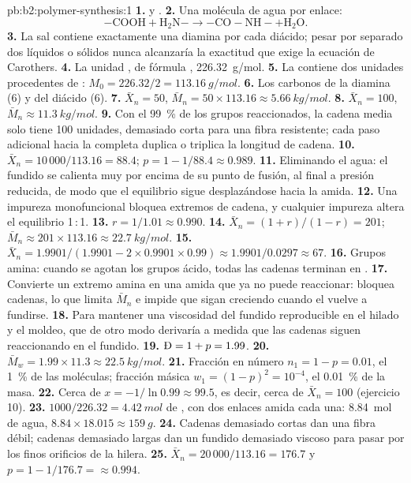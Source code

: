 \begin{solution}{pb:b2:polymer-synthesis:1}
\textbf{1.}  y .
\textbf{2.} Una molécula de agua por enlace:
\[\mathrm{{-}COOH + H_2N{-} \longrightarrow {-}CO{-}NH{-} + H_2O}.\]
\textbf{3.} La sal contiene exactamente una diamina por cada diácido; pesar por separado dos líquidos o sólidos
nunca alcanzaría la exactitud que exige la ecuación de Carothers.
\textbf{4.} La unidad \ce{-[NH(CH2)6NH-CO(CH2)4CO]-}, de fórmula , \qty{226.32}{g/mol}.
\textbf{5.} La  contiene dos unidades procedentes de : $M_0 = 226.32/2 = \qty{113.16}{g/mol}$.
\textbf{6.} Los carbonos de la diamina (6) y del diácido (6).
\textbf{7.} $\bar X_n = 50$, $\bar M_n = 50 \times 113.16 \approx \qty{5.66}{kg/mol}$.
\textbf{8.} $\bar X_n = 100$, $\bar M_n \approx \qty{11.3}{kg/mol}$.
\textbf{9.} Con el 99~\% de los grupos reaccionados, la cadena media solo tiene 100 unidades, demasiado corta para una
fibra resistente; cada paso adicional hacia la  completa duplica o triplica la longitud de cadena.
\textbf{10.} $\bar X_n = 10\,000/113.16 = 88.4$; $p = 1 - 1/88.4 \approx 0.989$.
\textbf{11.} Eliminando el agua: el fundido se calienta muy por encima de su punto de fusión, al final a presión
reducida, de modo que el equilibrio sigue desplazándose hacia la amida.
\textbf{12.} Una impureza monofuncional bloquea extremos de cadena, y cualquier impureza altera el equilibrio 1\,:\,1.
\textbf{13.} $r = 1/1.01 \approx 0.990$.
\textbf{14.} $\bar X_n = (1+r)/(1-r) = 201$; $\bar M_n \approx 201 \times 113.16 \approx
\qty{22.7}{kg/mol}$.
\textbf{15.} $\bar X_n = 1.9901/(1.9901 - 2 \times 0.9901 \times 0.99) \approx 1.9901/0.0297 \approx
67$.
\textbf{16.} Grupos amina: cuando se agotan los grupos ácido, todas las cadenas terminan en .
\textbf{17.} Convierte un extremo amina en una amida que ya no puede reaccionar: bloquea cadenas, lo que limita
$\bar M_n$ e impide que sigan creciendo cuando el  vuelve a fundirse.
\textbf{18.} Para mantener una viscosidad del fundido reproducible en el hilado y el moldeo, que de otro modo
derivaría a medida que las cadenas siguen reaccionando en el fundido.
\textbf{19.} $\text{\DH} = 1 + p = 1.99$.
\textbf{20.} $\bar M_w = 1.99 \times 11.3 \approx \qty{22.5}{kg/mol}$.
\textbf{21.} Fracción en número $n_1 = 1 - p = 0.01$, el 1~\% de las moléculas; fracción másica $w_1 = (1-p)^2 =
10^{-4}$, el 0.01~\% de la masa.
\textbf{22.} Cerca de $x = -1/\ln 0.99 \approx 99.5$, es decir, cerca de $\bar X_n = 100$ (ejercicio 10).
\textbf{23.} $1000/226.32 = \qty{4.42}{mol}$ de , con dos enlaces amida cada una: \qty{8.84}{mol} de
agua, $8.84 \times 18.015 \approx \qty{159}{g}$.
\textbf{24.} Cadenas demasiado cortas dan una fibra débil; cadenas demasiado largas dan un fundido demasiado viscoso para pasar
por los finos orificios de la hilera.
\textbf{25.} $\bar X_n = 20\,000/113.16 = 176.7$ y $p = 1 - 1/176.7 = \boldsymbol{\approx 0.994}$.
\end{solution}
